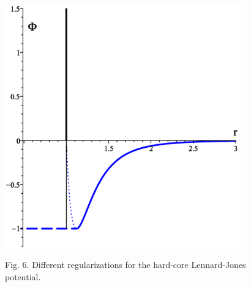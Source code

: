 \documentclass[8pt]{beamer}
\begin{document}
\begin{frame}
\begin{columns}
\begin{column}{0.4\textwidth}
				\begin{figure}[htbp]
					\includegraphics[width=0.9\textwidth,angle=0]{hclj_wca} \\
					\parbox{0.8\textwidth}{\caption*{Fig. 6. Different regularizations for the hard-core Lennard-Jones potential.
				}}
				\end{figure}				
			\end{column}
			
		\end{columns}
		
	\end{frame}
	
\end{document}
